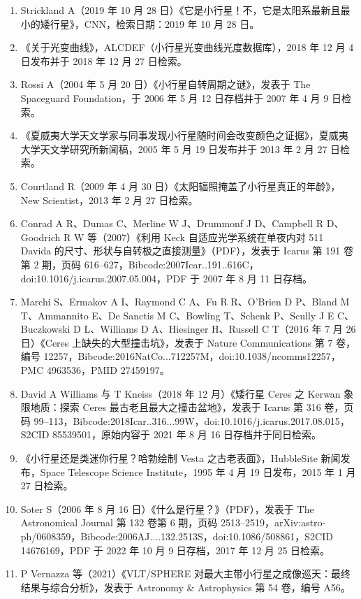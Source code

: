 \begin{enumerate}
\item Strickland A（2019 年 10 月 28 日）《它是小行星！不，它是太阳系最新且最小的矮行星》，CNN，检索日期：2019 年 10 月 28 日。
\item 《关于光变曲线》，ALCDEF（小行星光变曲线光度数据库），2018 年 12 月 4 日发布并于 2018 年 12 月 27 日检索。
\item Rossi A（2004 年 5 月 20 日）《小行星自转周期之谜》，发表于 The Spaceguard Foundation，于 2006 年 5 月 12 日存档并于 2007 年 4 月 9 日检索。
\item 《夏威夷大学天文学家与同事发现小行星随时间会改变颜色之证据》，夏威夷大学天文学研究所新闻稿，2005 年 5 月 19 日发布并于 2013 年 2 月 27 日检索。
\item Courtland R（2009 年 4 月 30 日）《太阳辐照掩盖了小行星真正的年龄》，New Scientist，2013 年 2 月 27 日检索。
\item Conrad A R、Dumas C、Merline W J、Drummonf J D、Campbell R D、Goodrich R W 等（2007）《利用 Keck 自适应光学系统在单夜内对 511 Davida 的尺寸、形状与自转极之直接测量》（PDF），发表于 Icarus 第 191 卷第 2 期，页码 616–627，Bibcode:2007Icar..191..616C，doi:10.1016/j.icarus.2007.05.004，PDF 于 2007 年 8 月 11 日存档。
\item Marchi S、Ermakov A I、Raymond C A、Fu R R、O'Brien D P、Bland M T、Ammannito E、De Sanctis M C、Bowling T、Schenk P、Scully J E C、Buczkowski D L、Williams D A、Hiesinger H、Russell C T（2016 年 7 月 26 日）《Ceres 上缺失的大型撞击坑》，发表于 Nature Communications 第 7 卷，编号 12257，Bibcode:2016NatCo...712257M，doi:10.1038/ncomms12257，PMC 4963536，PMID 27459197。
\item David A Williams 与 T Kneiss（2018 年 12 月）《矮行星 Ceres 之 Kerwan 象限地质：探索 Ceres 最古老且最大之撞击盆地》，发表于 Icarus 第 316 卷，页码 99–113，Bibcode:2018Icar..316...99W，doi:10.1016/j.icarus.2017.08.015，S2CID 85539501，原始内容于 2021 年 8 月 16 日存档并于同日检索。
\item 《小行星还是类迷你行星？哈勃绘制 Vesta 之古老表面》，HubbleSite 新闻发布，Space Telescope Science Institute，1995 年 4 月 19 日发布，2015 年 1 月 27 日检索。
\item Soter S（2006 年 8 月 16 日）《什么是行星？》（PDF），发表于 The Astronomical Journal 第 132 卷第 6 期，页码 2513–2519，arXiv:astro-ph/0608359，Bibcode:2006AJ....132.2513S，doi:10.1086/508861，S2CID 14676169，PDF 于 2022 年 10 月 9 日存档，2017 年 12 月 25 日检索。
\item P Vernazza 等（2021）《VLT/SPHERE 对最大主带小行星之成像巡天：最终结果与综合分析》，发表于 Astronomy & Astrophysics 第 54 卷，编号 A56。

\end{enumerate}
